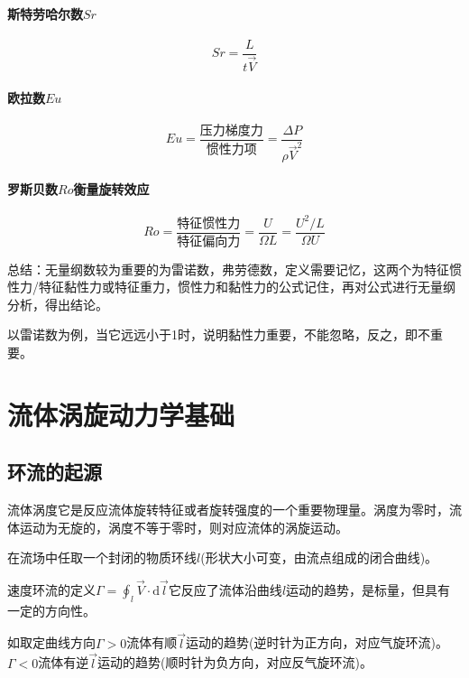 \documentclass[a4paper,oneside]{ctexbook}
\begin{document}
\subsubsection{斯特劳哈尔数\(Sr\)}
\begin{equation}
    Sr=\dfrac{L}{t\overrightarrow{V}}
\end{equation}

\subsubsection{欧拉数\(Eu\)}
\begin{equation}
    Eu=\dfrac{\text{压力梯度力}}{\text{惯性力项}}=\dfrac{\Delta{P}}{\rho{\overrightarrow{V}}^2}
\end{equation}

\subsubsection{罗斯贝数\(Ro\)衡量旋转效应}
\begin{equation}
    Ro=\dfrac{\text{特征惯性力}}{\text{特征偏向力}}=\dfrac{U}{\Omega{L}}=\dfrac{U^2/L}{\Omega{U}}
\end{equation}

总结：无量纲数较为重要的为雷诺数，弗劳德数，定义需要记忆，这两个为特征惯性力/特征黏性力或特征重力，惯性力和黏性力的公式记住，再对公式进行无量纲分析，得出结论。

以雷诺数为例，当它远远小于1时，说明黏性力重要，不能忽略，反之，即不重要。

\chapter{流体涡旋动力学基础}

\section{环流的起源}

流体涡度它是反应流体旋转特征或者旋转强度的一个重要物理量。涡度为零时，流体运动为无旋的，涡度不等于零时，则对应流体的涡旋运动。

在流场中任取一个封闭的物质环线\(l\)(形状大小可变，由流点组成的闭合曲线)。

速度环流的定义\(\Gamma=\oint_l\overrightarrow{V}\cdot\mathrm{d}\overrightarrow{l}\)它反应了流体沿曲线\(l\)运动的趋势，是标量，但具有一定的方向性。

如取定曲线方向\(\Gamma>0\)流体有顺\(\overrightarrow{l}\)运动的趋势(逆时针为正方向，对应气旋环流)。\(\Gamma<0\)流体有逆\(\overrightarrow{l}\)运动的趋势(顺时针为负方向，对应反气旋环流)。
\end{document}
